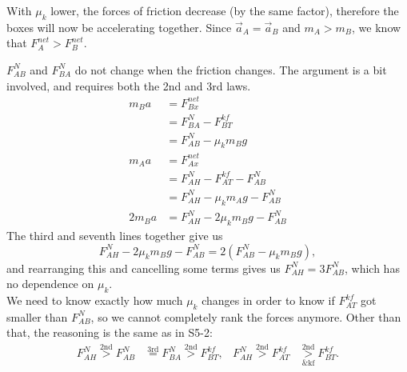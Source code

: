 \documentclass[]{article}
\begin{document}
\begin{TeacherMargin}
\noindent With $\mu_{k}$ lower, the forces of friction decrease (by the same factor), therefore the boxes will now be accelerating together. Since $\vec{a}_{A} = \vec{a}_{B}$ and $m_{A} > m_{B}$, we know that $F^{net}_{A} > F^{net}_{B}$.
\begin{center}
\end{center}
$F^{N}_{AB}$ and $F^{N}_{BA}$ do not change when the friction changes. The argument is a bit involved, and requires both the 2nd and 3rd laws.
\begin{align*}
	m_{B}a & = F^{net}_{Bx} \\
	& = F^{N}_{BA}-F^{kf}_{BT} \\
	& = F^{N}_{AB}-\mu_{k}m_{B}g \\
	m_{A}a & = F^{net}_{Ax} \\
	& = F^{N}_{AH}-F^{kf}_{AT}-F^{N}_{AB} \\
	& = F^{N}_{AH}-\mu_{k}m_{A}g-F^{N}_{AB} \\
	2m_{B}a & = F^{N}_{AH}-2\mu_{k}m_{B}g-F^{N}_{AB}
\end{align*}
The third and seventh lines together give us
\[
F^{N}_{AH}-2\mu_{k}m_{B}g-F^{N}_{AB} = 2(F^{N}_{AB}-\mu_{k}m_{B}g),
\]
and rearranging this and cancelling some terms gives us $F^{N}_{AH} = 3F^{N}_{AB}$, which has no dependence on $\mu_{k}$. \\

\noindent We need to know exactly how much $\mu_{k}$ changes in order to know if $F^{kf}_{AT}$ got smaller than $F^{N}_{AB}$, so we cannot completely rank the forces anymore. Other than that, the reasoning is the same as in S5-2:
\begin{align*}
	F^{N}_{AH} \overset{\text{2nd}}{>} F^{N}_{AB} & \overset{\text{3rd}}{=} F^{N}_{BA} \overset{\text{2nd}}{>} F^{kf}_{BT}, & F^{N}_{AH} \overset{\text{2nd}}{>} F^{kf}_{AT} & \underset{\text{\& kf}}{\overset{\text{2nd}}{>}} F^{kf}_{BT}.
\end{align*}
\end{TeacherMargin}
\end{document}
